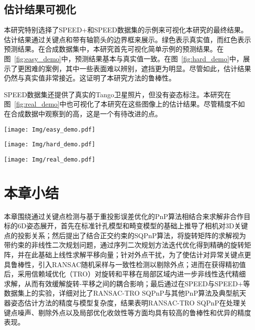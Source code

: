 \subsection{估计结果可视化}

本研究特别选择了SPEED+和SPEED数据集的示例来可视化本研究的最终结果。估计结果通过关键点和带有轴箭头的边界框来展示。绿色表示真实值，而红色表示预测结果。在合成数据集中，本研究首先可视化简单示例的预测结果。在图~\ref{fig:easy_demo}中，预测结果基本与真实值一致。在图~\ref{fig:hard_demo}中，展示了更困难的案例，其中一些表面难以辨别，遮挡更为明显。尽管如此，估计结果仍然与真实值非常接近。这证明了本研究方法的鲁棒性。

SPEED数据集还提供了真实的Tango卫星照片，但没有姿态标注。本研究在图~\ref{fig:real_demo}中也可视化了本研究在这些图像上的估计结果。尽管精度不如在合成数据中观察到的高，这是一个有待改进的点。

\begin{figure*}[!t] \centering \texttt{[image: Img/easy\_demo.pdf]} \caption{SPEED+合成图像估计结果可视化的简单示例} \label{fig:easy_demo} \end{figure*}

\begin{figure*}[!t] \centering \texttt{[image: Img/hard\_demo.pdf]} \caption{SPEED+合成图像估计结果可视化的困难示例} \label{fig:hard_demo} \end{figure*}

\begin{figure*}[htbp] \centering \texttt{[image: Img/real\_demo.pdf]} \caption{在SPEED真实图像上的6D估计结果的实际示例} \label{fig:real_demo} \end{figure*}


\section{本章小结}
\label{sec:RANSAC-TRO-SQPnP:summary}
本章围绕通过关键点检测与基于重投影误差优化的PnP算法相结合来求解非合作目标的6D姿态展开，首先在标准针孔模型和畸变模型的基础上推导了相机对3D关键点的投影关系；然后提出了结合正交约束的SQPnP算法，将旋转矩阵的求解视为带约束的非线性二次规划问题，通过序列二次规划方法迭代优化得到精确的旋转矩阵，并在此基础上线性求解平移向量；针对外点干扰，为了使估计对异常关键点更具鲁棒性，引入RANSAC随机采样与一致性检测以剔除外点；进而在获得精初值后，采用信赖域优化（TRO）对旋转和平移在局部区域内进一步非线性迭代精细求解，从而有效缓解旋转-平移之间的耦合影响；最后通过在SPEED与SPEED+等数据集上的实验，详细对比了RANSAC-TRO SQPnP与其他PnP算法及典型航天器姿态估计方法的精度与模型复杂度，结果表明RANSAC-TRO SQPnP在处理关键点噪声、剔除外点以及局部优化收敛性等方面均具有较高的鲁棒性和优异的精度表现。

